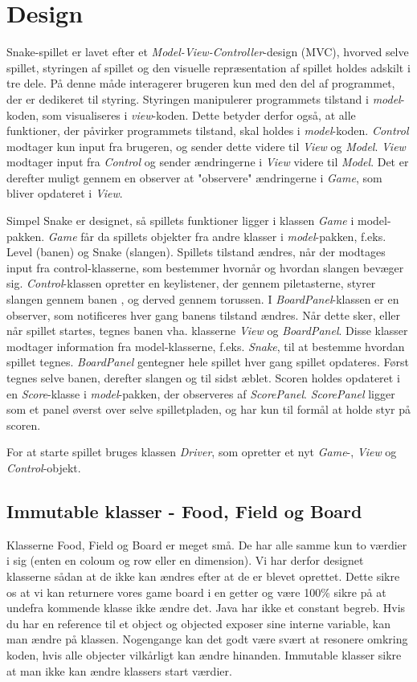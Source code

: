 \section{Design}
Snake-spillet er lavet efter et \textit{Model-View-Controller}-design (MVC), hvorved selve spillet, styringen af spillet og den visuelle repræsentation af spillet holdes adskilt i tre dele. På denne måde interagerer brugeren kun med den del af programmet, der er dedikeret til styring. Styringen manipulerer programmets tilstand i \textit{model}-koden, som visualiseres i \textit{view}-koden. Dette betyder derfor også, at alle funktioner, der påvirker programmets tilstand, skal holdes i \textit{model}-koden. \textit{Control} modtager kun input fra brugeren, og sender dette videre til \textit{View} og \textit{Model}. \textit{View} modtager input fra \textit{Control} og sender ændringerne i \textit{View} videre til \textit{Model}. Det er derefter muligt gennem en observer at "observere" ændringerne i \textit{Game}, som bliver opdateret i \textit{View}.

Simpel Snake er designet, så spillets funktioner ligger i klassen \textit{Game} i model-pakken. \textit{Game} får da spillets objekter fra andre klasser i \textit{model}-pakken, f.eks. Level (banen) og Snake (slangen). Spillets tilstand ændres, når der modtages input fra control-klasserne, som bestemmer hvornår og hvordan slangen bevæger sig. \textit{Control}-klassen opretter en keylistener, der gennem piletasterne, styrer slangen gennem banen , og derved gennem torussen.
I \textit{BoardPanel}-klassen er en observer, som notificeres hver gang banens tilstand ændres. Når dette sker, eller når spillet startes, tegnes banen vha. klasserne \textit{View} og \textit{BoardPanel}. Disse klasser modtager information fra model-klasserne, f.eks. \textit{Snake}, til at bestemme hvordan spillet tegnes. \textit{BoardPanel} gentegner hele spillet hver gang spillet opdateres. Først tegnes selve banen, derefter slangen og til sidst æblet. 
Scoren holdes opdateret i en \textit{Score}-klasse i \textit{model}-pakken, der observeres af \textit{ScorePanel}. \textit{ScorePanel} ligger som et panel øverst over selve spilletpladen, og har kun til formål at holde styr på scoren.

For at starte spillet bruges klassen \textit{Driver}, som opretter et nyt \textit{Game}-, \textit{View} og \textit{Control}-objekt.

\subsection*{Immutable klasser - Food, Field og Board}
Klasserne Food, Field og Board er meget små. De har alle samme kun to værdier i sig (enten en coloum og row eller en dimension). Vi har derfor designet klasserne sådan at de ikke kan ændres efter at de er blevet oprettet. Dette sikre os at vi kan returnere vores game board i en getter og være 100\% sikre på at undefra kommende klasse ikke ændre det. Java har ikke et constant begreb. Hvis du har en reference til et object og objected exposer sine interne variable,  kan man ændre på klassen. Nogengange kan det godt være svært at resonere omkring koden, hvis alle objecter vilkårligt kan ændre hinanden. Immutable klasser sikre at man ikke kan ændre klassers start værdier.